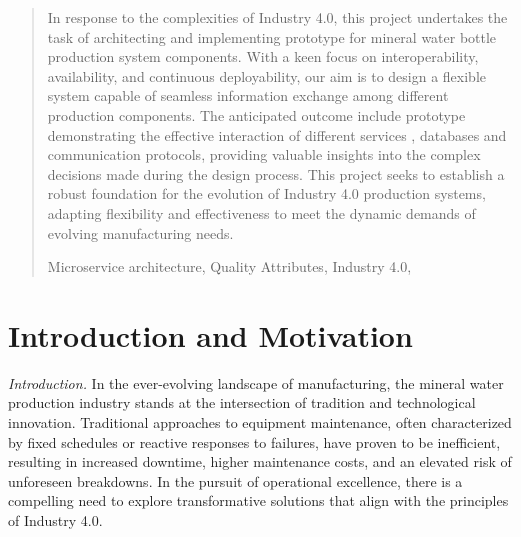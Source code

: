 \documentclass[conference]{IEEEtran}
\begin{document}



\maketitle
\IEEEpubidadjcol
\begin{abstract}

In response to the complexities of Industry 4.0, this project undertakes the task of architecting and implementing prototype for mineral water bottle production system components. With a keen focus on interoperability, availability, and continuous deployability, our aim is to design a flexible system capable of seamless information exchange among different production components.  The anticipated outcome include prototype demonstrating the effective interaction of different services , databases and communication protocols, providing valuable insights into the complex decisions made during the design process. This project  seeks to establish a robust foundation for the evolution of Industry 4.0 production systems, adapting flexibility and effectiveness to meet the dynamic demands of evolving manufacturing needs. 

\begin{IEEEkeywords}
    Microservice architecture, Quality Attributes, Industry 4.0,
\end{IEEEkeywords}
\end{abstract}

\section{Introduction and Motivation}


\emph{Introduction.}
In the ever-evolving landscape of manufacturing, the mineral water production industry stands at the intersection of tradition and technological innovation. Traditional approaches to equipment maintenance, often characterized by fixed schedules or reactive responses to failures, have proven to be inefficient, resulting in increased downtime, higher maintenance costs, and an elevated risk of unforeseen breakdowns. In the pursuit of operational excellence, there is a compelling need to explore transformative solutions that align with the principles of Industry 4.0.
\end{document}

